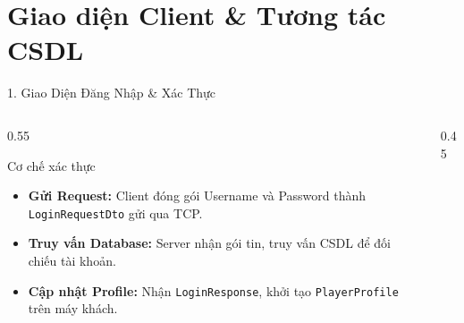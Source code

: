 
\section{Giao diện Client & Tương tác CSDL}

\begin{frame}{1. Giao Diện Đăng Nhập & Xác Thực}
\begin{columns}
\begin{column}{0.55\textwidth}
\begin{block}{Cơ chế xác thực}
\begin{itemize}
\item \textbf{Gửi Request:} Client đóng gói Username và Password thành \texttt{LoginRequestDto} gửi qua TCP.
\item \textbf{Truy vấn Database:} Server nhận gói tin, truy vấn CSDL để đối chiếu tài khoản.
\item \textbf{Cập nhật Profile:} Nhận \texttt{LoginResponse}, khởi tạo \texttt{PlayerProfile} trên máy khách.
\end{itemize}
\end{block}
\end{column}
\begin{column}{0.45\textwidth}
\centering
{}
\end{column}
\end{columns}
\end{frame}

